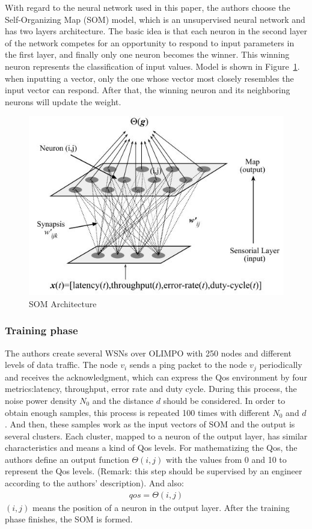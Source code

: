 \documentclass[11pt]{report}
\begin{document}
	\noindent With regard to the neural network used in this paper, the authors choose the Self-Organizing Map (SOM) model\cite{58325}, which is an unsupervised neural network and has two layers architecture. The basic idea is that each neuron in the second layer of the network competes for an opportunity to respond to input parameters in the first layer, and finally only one neuron becomes the winner. This winning neuron represents the classification of input values. Model is shown in Figure~\ref{1stfig}. when inputting a vector, only the one whose vector most closely resembles the input vector can respond. After that, the winning neuron and  its neighboring neurons will update the weight. 
	\begin{figure}[h!]
		\centering
		\includegraphics[width=0.5\linewidth]{figure1.jpg}
		\caption{SOM Architecture}
		\label{1stfig}
	\end{figure}
	
    \subsubsection{Training phase}
	The authors create several WSNs over OLIMPO \cite{1462037} with 250 nodes and different levels of data traffic. The node $v_i$ sends a ping packet to the node $v_j$ periodically and receives the acknowledgment, which can express the Qos environment by four metrics:latency, throughput, error rate and duty cycle. During this process, the noise power density $N_0$ and the distance $d$ should be considered. In order to obtain enough samples, this process is repeated 100 times with different $N_0$ and $d$. And then, these samples work as the input vectors of SOM and the output is several clusters. Each cluster, mapped to a neuron of the output layer, has similar characteristics and means a kind of Qos levels. For mathematizing the Qos, the authors define an output function $\Theta \left(i,j\right)$ with the values from 0 and 10 to represent the Qos levels. ({\color{red}Remark: this step should be supervised by an engineer according to the authors' description}). And also:\\
	\begin{eqnarray}
	qos = \Theta\left(i,j\right)
	\end{eqnarray}
	$\left(i,j\right)$ means the position of a neuron in the output layer. After the training phase finishes, the SOM is formed. 
	
\end{document}
